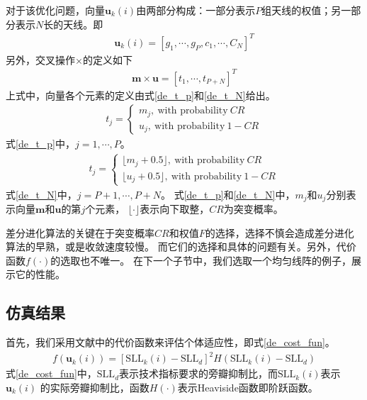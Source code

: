 \documentclass[master]{thesis-uestc}
\begin{document}
对于该优化问题，向量$\bm{u}_k(i)$由两部分构成：一部分表示$P$组天线的权值；另一部分表示$N$长的天线。即
\begin{equation}
    \begin{aligned}
        \bm{u}_k(i) = \left[g_1,\cdots,g_P,c_1,\cdots,C_N\right]^T
    \end{aligned}
\end{equation}
另外，交叉操作$\times$的定义如下
\begin{equation}
    \begin{aligned}
        \bm{m} \times \bm{u} = \left[t_1, \cdots, t_{P+N}\right]^T
    \end{aligned}
\end{equation}
上式中，向量各个元素的定义由式\eqref{de_t_p}和\eqref{de_t_N}给出。
\begin{equation}\label{de_t_p}
    \begin{aligned}
        t_j = 
        \begin{cases}
            m_j, ~ \text{with probability} ~ CR \\
            u_j, ~ \text{with probability} ~ 1 - CR
        \end{cases}
    \end{aligned}
\end{equation}
式\eqref{de_t_p}中，$j=1,\cdots,P$。
\begin{equation}\label{de_t_N}
    \begin{aligned}
        t_j = 
        \begin{cases}
            \lfloor m_j+0.5 \rfloor, ~ \text{with probability} ~ CR \\
            \lfloor u_j+0.5 \rfloor, ~ \text{with probability} ~ 1 - CR
        \end{cases}
    \end{aligned}
\end{equation}
式\eqref{de_t_N}中，$j=P+1,\cdots,P+N$。
式\eqref{de_t_p}和\eqref{de_t_N}中，$m_j$和$u_j$分别表示向量$\bm{m}$和$\bm{u}$的第$j$个元素，
$\lfloor\cdot\rfloor$表示向下取整，$CR$为突变概率。

差分进化算法的关键在于突变概率$CR$和权值$F$的选择，选择不慎会造成差分进化算法的早熟，或是收敛速度较慢。
而它们的选择和具体的问题有关。另外，代价函数$f(\cdot)$的选取也不唯一。
在下一个子节中，我们选取一个均匀线阵的例子，展示它的性能。

\subsection{仿真结果}
首先，我们采用文献\cite{Lopez_01}中的代价函数来评估个体适应性，即式\eqref{de_cost_fun}。
\begin{equation}\label{de_cost_fun}
    \begin{aligned}
        f(\bm{u}_k(i)) = \left[\text{SLL}_k(i)-\text{SLL}_d\right]^2 
        H\left(\text{SLL}_k(i)-\text{SLL}_d\right)
    \end{aligned}
\end{equation}
式\eqref{de_cost_fun}中，$\text{SLL}_d$表示技术指标要求的旁瓣抑制比，而$\text{SLL}_k(i)$表示$\bm{u}_k(i)$
的实际旁瓣抑制比，函数$H(\cdot)$表示Heaviside函数即阶跃函数。
\end{document}
